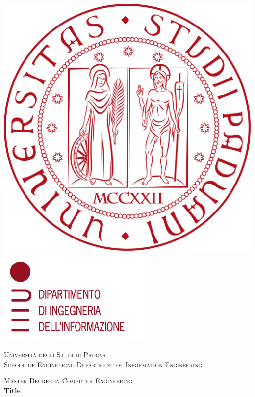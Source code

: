 \documentclass[a4paper,12pt]{report}
\begin{document}
\begin{titlepage}
    \begin{center}

    \includegraphics[height=0.13\textheight]{logo_unipd.png}
    \hfill
    \includegraphics[height=0.13\textheight]{logo_dei.png}
    \newline
    \newline

    \vspace{0.8cm}
    \textsc{\LARGE Universit\`{a} degli Studi di Padova}\\
    \vspace{1.6cm}
    \textsc{\large 	School of Engineering Department of Information Engineering}\\
    \vspace{0.4cm}

    \textsc{\large Master Degree in Computer Engineering}\\
    \vfill
    { \LARGE \bfseries Title}\\
    \vspace{.2cm}


\end{center}
\end{titlepage}
\end{document}
